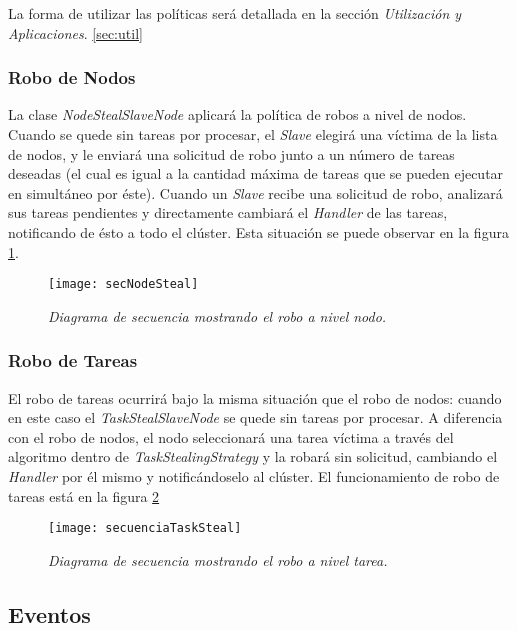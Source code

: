 \documentclass[12pt,a4paper,oneside,spanish]{report}
\begin{document}
La forma de utilizar las políticas será detallada en la sección \textit{Utilización y Aplicaciones}. \ref{sec:util}

\subsubsection*{Robo de Nodos}

La clase \textit{NodeStealSlaveNode} aplicará la política de robos a nivel de nodos. Cuando se quede sin tareas por procesar, el \textit{Slave} elegirá una víctima de la lista de nodos, y le enviará una solicitud de robo junto a un número de tareas deseadas (el cual es igual a la cantidad máxima de tareas que se pueden ejecutar en simultáneo por éste). Cuando un \textit{Slave} recibe una solicitud de robo, analizará sus tareas pendientes y directamente cambiará el \textit{Handler} de las tareas, notificando de ésto a todo el clúster. Esta situación se puede observar en la figura \ref{fig:secuenciaNodeSteal}.

\begin{figure}
\centering
\texttt{[image: secNodeSteal]}
\caption{\textit{Diagrama de secuencia mostrando el robo a nivel nodo.}}
\label{fig:secuenciaNodeSteal}
\end{figure}


\subsubsection*{Robo de Tareas}

El robo de tareas ocurrirá bajo la misma situación que el robo de nodos: cuando en este caso el \textit{TaskStealSlaveNode} se quede sin tareas por procesar. A diferencia con el robo de nodos, el nodo seleccionará una tarea víctima a través del algoritmo dentro de \textit{TaskStealingStrategy} y la robará sin solicitud, cambiando el \textit{Handler} por él mismo y notificándoselo al clúster. El funcionamiento de robo de tareas está en la figura \ref{fig:secuenciaTaskSteal}


\begin{figure}
\centering
\texttt{[image: secuenciaTaskSteal]}
\caption{\textit{Diagrama de secuencia mostrando el robo a nivel tarea.}}
\label{fig:secuenciaTaskSteal}
\end{figure}


\subsection*{Eventos}
\end{document}
